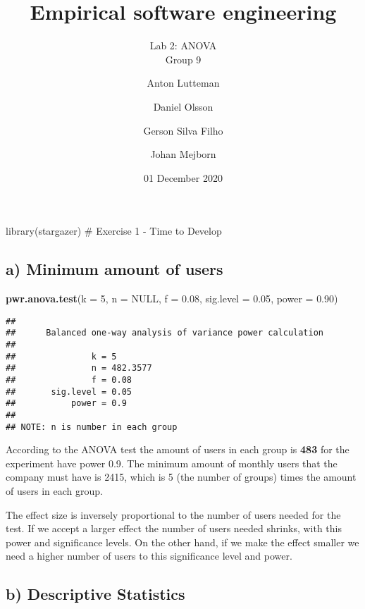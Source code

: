 \documentclass[
]{article}
\title{Empirical software engineering}
\subtitle{Lab 2: ANOVA\\
Group 9}
\author{Anton Lutteman \and Daniel Olsson \and Gerson Silva Filho \and Johan Mejborn}
\date{01 December 2020}
\newenvironment{Shaded}{\begin{snugshade}}{\end{snugshade}}
\newcommand{\DataTypeTok}[1]{\textcolor[rgb]{0.13,0.29,0.53}{#1}}
\newcommand{\DecValTok}[1]{\textcolor[rgb]{0.00,0.00,0.81}{#1}}
\newcommand{\FloatTok}[1]{\textcolor[rgb]{0.00,0.00,0.81}{#1}}
\newcommand{\KeywordTok}[1]{\textcolor[rgb]{0.13,0.29,0.53}{\textbf{#1}}}
\newcommand{\NormalTok}[1]{#1}
\newcommand{\OtherTok}[1]{\textcolor[rgb]{0.56,0.35,0.01}{#1}}
\begin{document}
\maketitle

library(stargazer) \# Exercise 1 - Time to Develop

\hypertarget{a-minimum-amount-of-users}{%
\subsection{a) Minimum amount of
users}\label{a-minimum-amount-of-users}}

\begin{Shaded}
\begin{Highlighting}[]
\KeywordTok{pwr.anova.test}\NormalTok{(}\DataTypeTok{k =} \DecValTok{5}\NormalTok{, }\DataTypeTok{n =} \OtherTok{NULL}\NormalTok{, }\DataTypeTok{f =} \FloatTok{0.08}\NormalTok{, }\DataTypeTok{sig.level =} \FloatTok{0.05}\NormalTok{, }\DataTypeTok{power =} \FloatTok{0.90}\NormalTok{)}
\end{Highlighting}
\end{Shaded}

\begin{verbatim}
## 
##      Balanced one-way analysis of variance power calculation 
## 
##               k = 5
##               n = 482.3577
##               f = 0.08
##       sig.level = 0.05
##           power = 0.9
## 
## NOTE: n is number in each group
\end{verbatim}

According to the ANOVA test the amount of users in each group is
\textbf{483} for the experiment have power 0.9. The minimum amount of
monthly users that the company must have is 2415, which is 5 (the number
of groups) times the amount of users in each group.

The effect size is inversely proportional to the number of users needed
for the test. If we accept a larger effect the number of users needed
shrinks, with this power and significance levels. On the other hand, if
we make the effect smaller we need a higher number of users to this
significance level and power.

\hypertarget{b-descriptive-statistics}{%
\subsection{b) Descriptive Statistics}\label{b-descriptive-statistics}}
\end{document}
